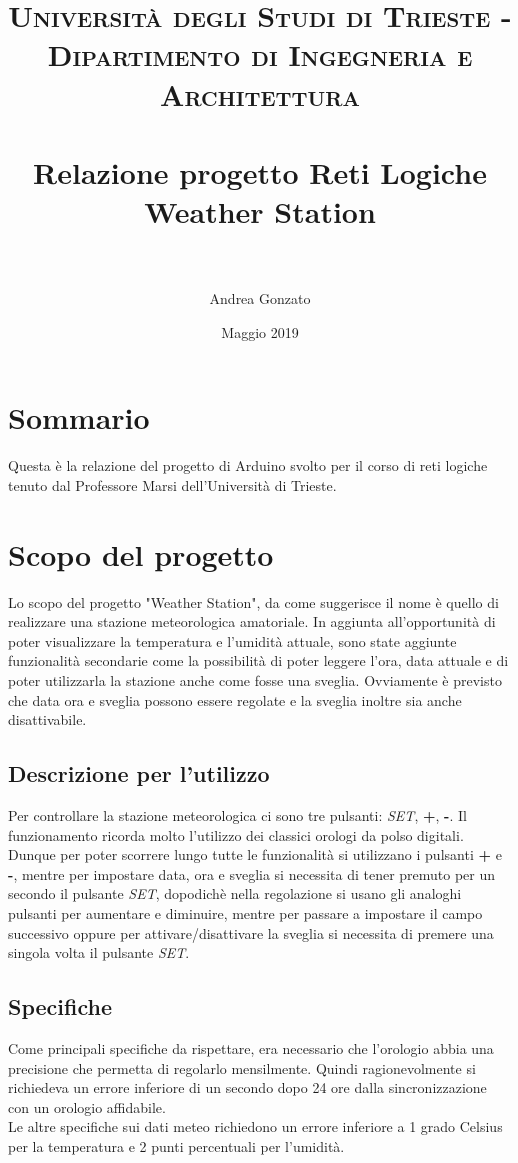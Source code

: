\documentclass[paper=a4, fontsize=10pt]{scrartcl}
\title{	
\normalfont \normalsize 
\textsc{Universit\`a degli Studi di Trieste - Dipartimento di Ingegneria e Architettura} \\ [25pt] %
\horrule{0.5pt} \\[0.4cm] %
\huge \textbf{Relazione progetto Reti Logiche\\ Weather Station}  \\ %
\horrule{2pt} \\[0.5cm] %
}
\author{Andrea Gonzato} %
\date{\normalsize Maggio 2019} %
\begin{document}
\maketitle %

\pagebreak

\tableofcontents

\pagebreak

\section{Sommario}
Questa è la relazione del progetto di Arduino svolto per il corso di reti logiche tenuto dal Professore Marsi dell'Università di Trieste.

\section{Scopo del progetto}
Lo scopo del progetto "Weather Station", da come suggerisce il nome è quello di realizzare una stazione meteorologica amatoriale. In aggiunta all'opportunità di poter visualizzare la temperatura e l'umidità attuale, sono state aggiunte funzionalità secondarie come la possibilità di poter leggere l'ora, data attuale e di poter utilizzarla la stazione anche come fosse una sveglia. Ovviamente è previsto che data ora e sveglia possono essere regolate e la sveglia inoltre sia anche disattivabile.

\subsection{Descrizione per l'utilizzo}
Per controllare la stazione meteorologica ci sono tre pulsanti: \textit{SET}, \textbf{+}, \textbf{-}.
Il funzionamento ricorda molto l'utilizzo dei classici orologi da polso digitali. Dunque per poter scorrere lungo tutte le funzionalità si utilizzano i pulsanti \textbf{+} e \textbf{-}, mentre per impostare data, ora e sveglia si necessita di tener premuto per un secondo il pulsante \textit{SET}, dopodichè nella regolazione si usano gli analoghi pulsanti per aumentare e diminuire, mentre per passare a impostare il campo successivo oppure per attivare/disattivare la sveglia si necessita di premere una singola volta il pulsante \textit{SET}.


\subsection{Specifiche}
Come principali specifiche da rispettare, era necessario che l'orologio abbia una precisione che permetta di regolarlo mensilmente. Quindi ragionevolmente si richiedeva un errore inferiore di un secondo dopo 24 ore dalla sincronizzazione con un orologio affidabile.\\
Le altre specifiche sui dati meteo richiedono un errore inferiore a 1 grado Celsius per la temperatura e 2 punti percentuali per l'umidità.
\end{document}
